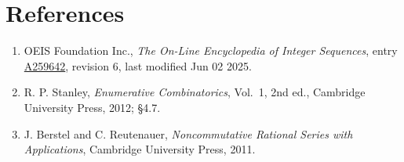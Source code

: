 \documentclass[11pt]{article}
\theoremstyle{definition}
\begin{document}
\section{References}

\begin{enumerate}

\item OEIS Foundation Inc., \emph{The On-Line Encyclopedia of Integer Sequences}, entry \href{https://oeis.org/A259642}{A259642}, revision 6, last modified Jun 02 2025.

\item R. P. Stanley, \emph{Enumerative Combinatorics}, Vol.~1, 2nd ed., Cambridge University Press, 2012; \S4.7.

\item J. Berstel and C. Reutenauer, \emph{Noncommutative Rational Series with Applications}, Cambridge University Press, 2011.

\end{enumerate}
\end{document}
